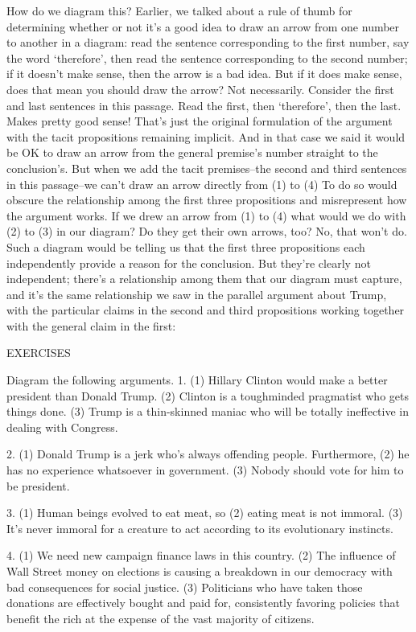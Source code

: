 How do we diagram this? Earlier, we talked about a rule of thumb for determining whether or not
it's a good idea to draw an arrow from one number to another in a diagram: read the sentence
corresponding to the first number, say the word `therefore', then read the sentence corresponding
to the second number; if it doesn't make sense, then the arrow is a bad idea. But if it does make
sense, does that mean you should draw the arrow? Not necessarily. Consider the first and last
sentences in this passage. Read the first, then `therefore', then the last. Makes pretty good sense!
That's just the original formulation of the argument with the tacit propositions remaining implicit.
And in that case we said it would be OK to draw an arrow from the general premise's number
straight to the conclusion's. But when we add the tacit premises--the second and third sentences
in this passage--we can't draw an arrow directly from (1) to (4) To do so would obscure the
relationship among the first three propositions and misrepresent how the argument works. If we
drew an arrow from (1) to (4) what would we do with (2) to (3) in our diagram? Do they get their
own arrows, too? No, that won't do. Such a diagram would be telling us that the first three
propositions each independently provide a reason for the conclusion. But they're clearly not
independent; there's a relationship among them that our diagram must capture, and it's the same
relationship we saw in the parallel argument about Trump, with the particular claims in the second
and third propositions working together with the general claim in the first:




EXERCISES

Diagram the following arguments.
1. (1) Hillary Clinton would make a better president than Donald Trump. (2) Clinton is a toughminded pragmatist who gets things done. (3) Trump is a thin-skinned maniac who will be totally
ineffective in dealing with Congress.

2. (1) Donald Trump is a jerk who's always offending people. Furthermore, (2) he has no
experience whatsoever in government. (3) Nobody should vote for him to be president.

3. (1) Human beings evolved to eat meat, so (2) eating meat is not immoral. (3) It's never immoral
for a creature to act according to its evolutionary instincts.

4. (1) We need new campaign finance laws in this country. (2) The influence of Wall Street money
on elections is causing a breakdown in our democracy with bad consequences for social justice.
(3) Politicians who have taken those donations are effectively bought and paid for, consistently
favoring policies that benefit the rich at the expense of the vast majority of citizens.

